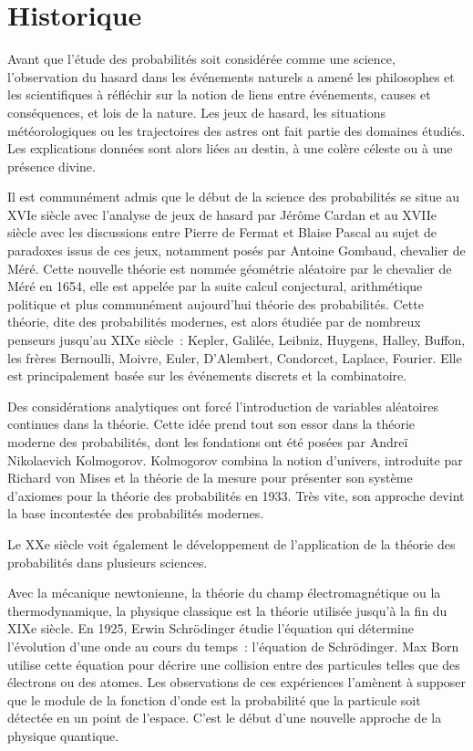 \section{Historique}\label{I-historique}

Avant que l'étude des probabilités soit considérée comme une science,
l'observation du hasard dans les événements naturels a amené les
philosophes et les scientifiques à réfléchir sur la notion de liens
entre événements, causes et conséquences, et lois de la nature. Les jeux
de hasard, les situations météorologiques ou les trajectoires des astres
ont fait partie des domaines étudiés. Les explications données sont
alors liées au destin, à une colère céleste ou à une présence divine.

Il est communément admis que le début de la science des probabilités se
situe au XVIe siècle avec l'analyse de jeux de hasard par Jérôme Cardan
et au XVIIe siècle avec les discussions entre Pierre de Fermat et Blaise
Pascal au sujet de paradoxes issus de ces jeux, notamment posés par
Antoine Gombaud, chevalier de Méré. Cette nouvelle théorie est nommée
géométrie aléatoire par le chevalier de Méré en 1654, elle est appelée
par la suite calcul conjectural, arithmétique politique et plus
communément aujourd'hui théorie des probabilités. Cette théorie, dite
des probabilités modernes, est alors étudiée par de nombreux penseurs
jusqu'au XIXe siècle~: Kepler, Galilée, Leibniz, Huygens, Halley,
Buffon, les frères Bernoulli, Moivre, Euler, D'Alembert, Condorcet,
Laplace, Fourier. Elle est principalement basée sur les événements
discrets et la combinatoire.

Des considérations analytiques ont forcé l'introduction de variables
aléatoires continues dans la théorie. Cette idée prend tout son essor
dans la théorie moderne des probabilités, dont les fondations ont été
posées par Andreï Nikolaevich Kolmogorov. Kolmogorov combina la notion
d'univers, introduite par Richard von Mises et la théorie de la mesure
pour présenter son système d'axiomes pour la théorie des probabilités en
1933. Très vite, son approche devint la base incontestée des
probabilités modernes.

Le XXe siècle voit également le développement de l'application de la
théorie des probabilités dans plusieurs sciences.

Avec la mécanique newtonienne, la théorie du champ électromagnétique ou
la thermodynamique, la physique classique est la théorie utilisée
jusqu'à la fin du XIXe siècle. En 1925, Erwin Schrödinger étudie
l'équation qui détermine l'évolution d'une onde au cours du temps~:
l'équation de Schrödinger. Max Born utilise cette équation pour décrire
une collision entre des particules telles que des électrons ou des
atomes. Les observations de ces expériences l'amènent à supposer que le
module de la fonction d'onde est la probabilité que la particule soit
détectée en un point de l'espace. C'est le début d'une nouvelle approche
de la physique quantique.

